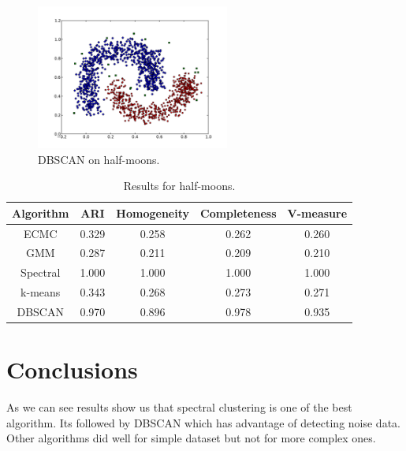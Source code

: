 \documentclass[conference]{IEEEtran}
\begin{document}
\begin{figure}[th]
\centering
\includegraphics[width=15pc]{dbscan_half-moons.pdf}
\caption{DBSCAN on half-moons.}
\label{DBSCAN_halfmoons}
\end{figure}

\begin{table}[htbp]
\caption{Results for half-moons.}
\label{halfmoonsresults}
\begin{center}
\setlength{\tabcolsep}{3pt}
\begin{tabular}{ |c|c|c|c|c| }
\hline
	\bf Algorithm & \bf ARI & \bf Homogeneity & \bf Completeness & \bf V-measure\\ \hline
	
	ECMC & 0.329 & 0.258 & 0.262 & 0.260 \\ \hline
	GMM & 0.287 & 0.211 & 0.209 & 0.210 \\ \hline
	Spectral & 1.000 & 1.000 & 1.000 & 1.000 \\ \hline
	k-means & 0.343 & 0.268 & 0.273 & 0.271 \\ \hline
	DBSCAN & 0.970 & 0.896 & 0.978 & 0.935 \\ \hline
\end{tabular}
\end{center}
\end{table}


\section{Conclusions}

As we can see results show us that spectral clustering is one of the best algorithm. Its followed by
DBSCAN which has advantage of detecting noise data. Other algorithms did well for simple dataset
but not for more complex ones.
\end{document}
